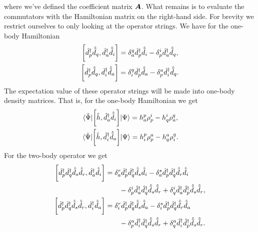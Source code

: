             where we've defined the coefficient matrix $\boldsymbol{A}$.
            What remains is to evaluate the commutators with the Hamiltonian
            matrix on the right-hand side.
            For brevity we restrict ourselves to only looking at the operator
            strings.
            We have for the one-body Hamiltonian
            \begin{gather}
                \left[\hat{d}^{\dagger}_{p}\hat{\tilde{d}}_{q}, \hat{d}^{\dagger}_{a}\hat{\tilde{d}}_{i}\right]
                = \delta^{q}_{a}\hat{d}^{\dagger}_{p}\hat{\tilde{d}}_{i}
                - \delta^{i}_{p}\hat{d}^{\dagger}_{a}\hat{\tilde{d}}_{q}, \\
                \left[\hat{d}^{\dagger}_{p}\hat{\tilde{d}}_{q}, \hat{d}^{\dagger}_{i}\hat{\tilde{d}}_{a}\right]
                = \delta^{q}_{i}\hat{d}^{\dagger}_{p}\hat{\tilde{d}}_{a}
                - \delta^{a}_{p}\hat{d}^{\dagger}_{i}\hat{\tilde{d}}_{q}.
            \end{gather}
            The expectation value of these operator strings will be made into
            one-body density matrices.
            That is, for the one-body Hamiltonian we get
            \begin{gather}
                \mel*{\tilde{\Psi}}{
                    \left[
                        \hat{h}
                    , 
                        \hat{d}^{\dagger}_{a}
                        \hat{\tilde{d}}_{i}
                    \right]
                }{\Psi}
                = h^{p}_{a}\rho^{i}_{p}
                - h^{i}_{q}\rho^{q}_{a},
                \\
                \mel*{\tilde{\Psi}}{
                    \left[
                        \hat{h}
                    , 
                        \hat{d}^{\dagger}_{i}
                        \hat{\tilde{d}}_{a}
                    \right]
                }{\Psi}
                =
                h^{p}_{i}\rho^{a}_{p}
                -
                h^{a}_{q}\rho^{q}_{i}.
            \end{gather}
            For the two-body operator we get
            \begin{align}
                \left[\hat{d}^{\dagger}_{p}\hat{d}^{\dagger}_{q}\hat{\tilde{d}}_{s}\hat{\tilde{d}}_{r}, \hat{d}^{\dagger}_{a}\hat{\tilde{d}}_{i}\right]
                &=
                \delta^{r}_{a}\hat{d}^{\dagger}_{p}\hat{d}^{\dagger}_{q}\hat{\tilde{d}}_{s}\hat{\tilde{d}}_{i}
                - \delta^{s}_{a}\hat{d}^{\dagger}_{p}\hat{d}^{\dagger}_{q}\hat{\tilde{d}}_{r}\hat{\tilde{d}}_{i}
                \nonumber \\
                &\qquad
                - \delta^{i}_{p}\hat{d}^{\dagger}_{a}\hat{d}^{\dagger}_{q}\hat{\tilde{d}}_{s}\hat{\tilde{d}}_{r}
                + \delta^{i}_{q}\hat{d}^{\dagger}_{a}\hat{d}^{\dagger}_{p}\hat{\tilde{d}}_{s}\hat{\tilde{d}}_{r},
                \\
                \left[\hat{d}^{\dagger}_{p}\hat{d}^{\dagger}_{q}\hat{\tilde{d}}_{s}\hat{\tilde{d}}_{r}, \hat{d}^{\dagger}_{i}\hat{\tilde{d}}_{a}\right]
                &=
                \delta^{r}_{i}\hat{d}^{\dagger}_{p}\hat{d}^{\dagger}_{q}\hat{\tilde{d}}_{s}\hat{\tilde{d}}_{a}
                - \delta^{s}_{i}\hat{d}^{\dagger}_{p}\hat{d}^{\dagger}_{q}\hat{\tilde{d}}_{r}\hat{\tilde{d}}_{a}
                \nonumber \\
                &\qquad
                - \delta^{a}_{p}\hat{d}^{\dagger}_{i}\hat{d}^{\dagger}_{q}\hat{\tilde{d}}_{s}\hat{\tilde{d}}_{r}
                + \delta^{a}_{q}\hat{d}^{\dagger}_{i}\hat{d}^{\dagger}_{p}\hat{\tilde{d}}_{s}\hat{\tilde{d}}_{r}.
            \end{align}
